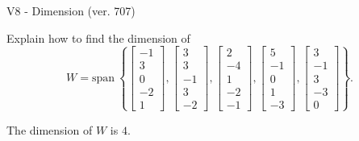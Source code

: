 \begin{exercise}
  \begin{exerciseTitle}V8 - Dimension (ver. 707)\end{exerciseTitle}
  \begin{exerciseStatement}
    Explain how to find the dimension of 
\[W=\mathrm{span}\ \left\{\left[\begin{array}{r}
-1 \\
3 \\
0 \\
-2 \\
1
\end{array}\right] , \left[\begin{array}{r}
3 \\
3 \\
-1 \\
3 \\
-2
\end{array}\right] , \left[\begin{array}{r}
2 \\
-4 \\
1 \\
-2 \\
-1
\end{array}\right] , \left[\begin{array}{r}
5 \\
-1 \\
0 \\
1 \\
-3
\end{array}\right] , \left[\begin{array}{r}
3 \\
-1 \\
3 \\
-3 \\
0
\end{array}\right]\right\}.\]



  \end{exerciseStatement}
  \begin{exerciseAnswer}
   The dimension of \(W\) is  \(4\).
  


  \end{exerciseAnswer}
\end{exercise}